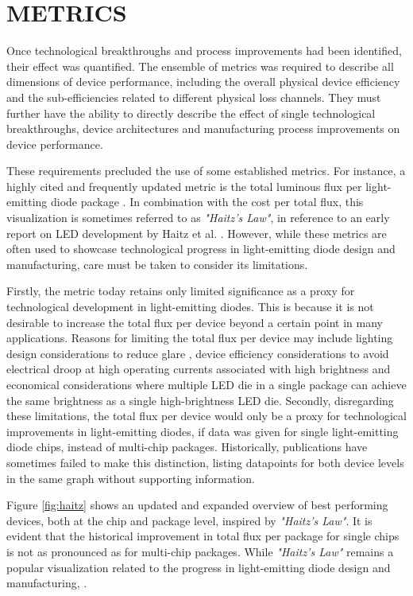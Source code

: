 \documentclass[a4paper,nocompress]{spie}  %
\begin{document}
\section{METRICS}

    Once technological breakthroughs and process improvements had been identified, their effect was quantified. The ensemble of metrics was required to describe all dimensions of device performance, including the overall physical device efficiency and the sub-efficiencies related to different physical loss channels. They must further have the ability to directly describe the effect of single technological breakthroughs, device architectures and manufacturing process improvements on device performance. 
    
    These requirements precluded the use of some established metrics. For instance, a highly cited and frequently updated metric is the total luminous flux per light-emitting diode package \cite{Liu2009,haitz2011solid,cho2017white,Fontoynont2018}. In combination with the cost per total flux, this visualization is sometimes referred to as \textit{"Haitz's Law"}, in reference to an early report on LED development by Haitz et al. \cite{haitz1999case}. However, while these metrics are often used to showcase technological progress in light-emitting diode design and manufacturing, care must be taken to consider its limitations.
    
    Firstly, the metric today retains only limited significance as a proxy for technological development in light-emitting diodes. This is because it is not desirable to increase the total flux per device beyond a certain point in many applications. Reasons for limiting the total flux per device may include lighting design considerations to reduce glare \cite{khan2015led}, device efficiency considerations to avoid electrical droop at high operating currents associated with high brightness \cite{Piprek2010} and economical considerations where multiple LED die in a single package can achieve the same brightness as a single high-brightness LED die. Secondly, disregarding these limitations, the total flux per device would only be a proxy for technological improvements in light-emitting diodes, if data was given for single light-emitting diode chips, instead of multi-chip packages. Historically, publications have sometimes failed to make this distinction, listing datapoints for both device levels in the same graph without supporting information.

    Figure \ref{fig:haitz} shows an updated and expanded overview of best performing devices, both at the chip and package level, inspired by \textit{"Haitz's Law"}. It is evident that the historical improvement in total flux per package for single chips is not as pronounced as for multi-chip packages. While \textit{"Haitz's Law"} remains a popular visualization related to the progress in light-emitting diode design and manufacturing, .
\end{document}
